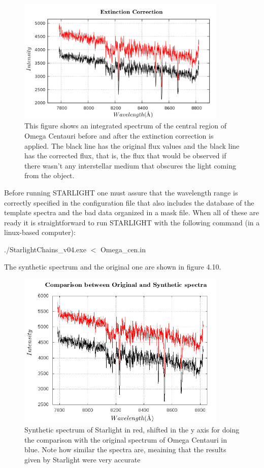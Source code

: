 \begin{figure}[H]
\centering
\includegraphics[width=10cm]{images/extinction.png}
\caption[Extinction Correction]{This figure shows an integrated spectrum of the central region of Omega Centauri before and after the extinction correction is applied. The black line has the original flux values and the black line has the corrected flux, that is, the flux that would be observed if there wasn't any interstellar medium that obscures the light coming from the object.}
\end{figure}

Before running STARLIGHT one must assure that the wavelength range is correctly specified in the configuration file that also includes the database of the template spectra and the bad data organized in a mask file. When all of these are ready it is straightforward to run STARLIGHT with the following command (in a linux-based computer):

\begin{center}
./StarlightChains\_v04.exe $<$ Omega\_cen.in
\end{center}

The synthetic spectrum and the original one are shown in figure 4.10.

\begin{figure}[H]
\centering
\includegraphics[width=10cm]{images/comparison.png}
\caption[Synthetic spectrum of STARLIGHT]{Synthetic spectrum of Starlight in red, shifted in the y axis for doing the comparison with the original spectrum of Omega Centauri in blue. Note how similar the spectra are, meaining that the results given by Starlight were very accurate}
\end{figure}
 

